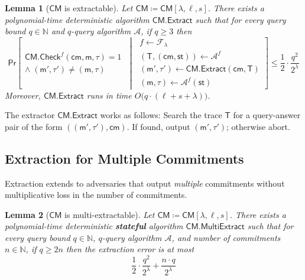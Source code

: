 \documentclass{article}
\newtheorem{lemma}{Lemma}
\newcommand{\Naturals}{\mathbb{N}}
\newcommand{\DefineEqual}{\coloneqq}
\newcommand{\Pr}{\mathsf{Pr}}
\newcommand{\GivenExperiment}{\;\middle|\;}
\newcommand{\StateExperiment}[1]{\begin{array}{l}#1\end{array}}
\newcommand{\ROFunction}{f}
\newcommand{\RODistribution}[1]{\mathcal{F}_{#1}}
\newcommand{\ROOutputSize}{\lambda}
\newcommand{\ROQueryBound}{q}
\newcommand{\ROTrace}{\mathsf{T}}
\newcommand{\ROAdvState}{\mathsf{st}}
\newcommand{\ROOutputAndTrace}[4]{(#3, #4) \gets #2^{#1}}
\newcommand{\ProtoSalt}{\tau}
\newcommand{\ProtoAdversary}{\mathcal{A}}
\newcommand{\CMSymbol}{\mathsf{CM}}
\newcommand{\CMConstructor}[3]{\CMSymbol[#1,#2,#3]}
\newcommand{\CMCheck}{\CMSymbol.\mathsf{Check}}
\newcommand{\CMExtractor}{\CMSymbol.\mathsf{Extract}}
\newcommand{\CMMultiExtractor}{\CMSymbol.\mathsf{MultiExtract}}
\newcommand{\CMMessageLength}{\ell}
\newcommand{\CMSaltSize}{s}
\newcommand{\CMCommitment}{\mathsf{cm}}
\newcommand{\CMMessage}{\mathsf{m}}
\newcommand{\CMSaltString}{\ProtoSalt}
\newcommand{\CMNumCommitments}{n}
\newcommand{\CMAdversary}{\ProtoAdversary}
\newcommand{\CMBindingExpression}[2]{\frac{1}{2} \cdot \frac{#2^2}{2^{#1}}}
\newcommand{\CMExtractabilityExpression}[2]{\CMBindingExpression{#1}{#2}}
\newcommand{\CMMultiExtractabilityExpression}[3]{\frac{1}{2} \cdot \frac{#2^2}{2^{#1}} + \frac{#3 \cdot #2}{2^{#1}}}
\begin{document}
\begin{lemma}[$\CMSymbol$ is extractable]
\label{lemma:cm-extractability}
Let $\CMSymbol \DefineEqual \CMConstructor{\ROOutputSize}{\CMMessageLength}{\CMSaltSize}$. There exists a polynomial-time deterministic algorithm $\CMExtractor$ such that for every query bound $\ROQueryBound \in \Naturals$ and $\ROQueryBound$-query algorithm $\CMAdversary$, if $\ROQueryBound \geq 3$ then
\begin{equation*}
\Pr\left[
\begin{array}{l}
\CMCheck^{\ROFunction}(\CMCommitment,\CMMessage,\CMSaltString)=1 \\
\land\;(\CMMessage',\CMSaltString') \neq (\CMMessage,\CMSaltString)
\end{array}
\GivenExperiment
\StateExperiment{
\ROFunction \gets \RODistribution{\ROOutputSize} \\
\ROOutputAndTrace{\ROFunction}{\CMAdversary}{\ROTrace}{(\CMCommitment,\ROAdvState)} \\
(\CMMessage',\CMSaltString') \gets \CMExtractor(\CMCommitment,\ROTrace) \\
(\CMMessage,\CMSaltString) \gets \CMAdversary^{\ROFunction}(\ROAdvState)
}
\right]
\leq
\CMExtractabilityExpression{\ROOutputSize}{\ROQueryBound}
\end{equation*}
Moreover, $\CMExtractor$ runs in time $O\big(\ROQueryBound \cdot (\CMMessageLength + \CMSaltSize + \ROOutputSize)\big)$.
\end{lemma}

The extractor $\CMExtractor$ works as follows: Search the trace $\ROTrace$ for a query-answer pair of the form $((\CMMessage',\CMSaltString'),\CMCommitment)$. If found, output $(\CMMessage',\CMSaltString')$; otherwise abort.

\subsection{Extraction for Multiple Commitments}

Extraction extends to adversaries that output \emph{multiple} commitments without multiplicative loss in the number of commitments.

\begin{lemma}[$\CMSymbol$ is multi-extractable]
\label{lemma:cm-multi-extractability}
Let $\CMSymbol \DefineEqual \CMConstructor{\ROOutputSize}{\CMMessageLength}{\CMSaltSize}$. There exists a polynomial-time deterministic \textbf{stateful} algorithm $\CMMultiExtractor$ such that for every query bound $\ROQueryBound \in \Naturals$, $\ROQueryBound$-query algorithm $\CMAdversary$, and number of commitments $\CMNumCommitments \in \Naturals$, if $\ROQueryBound \geq 2\CMNumCommitments$ then the extraction error is at most
\begin{equation*}
\CMMultiExtractabilityExpression{\ROOutputSize}{\ROQueryBound}{\CMNumCommitments}
\end{equation*}
\end{lemma}
\end{document}
